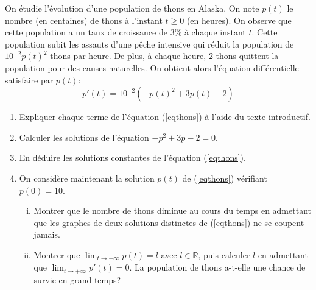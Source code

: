 \begin{exo}
    On étudie l'évolution d'une population de thons en Alaska. On note $p(t)$ le nombre (en centaines) de thons à l'instant $t\ge 0$ (en heures). On observe que cette population a un taux de croissance de 3\% à chaque instant $t$. Cette population subit les assauts d'une pêche intensive qui réduit la population de $10^{-2}p(t)^2$ thons par heure. De plus, à chaque heure, 2 thons quittent la population pour des causes naturelles. On obtient alors l'équation différentielle satisfaire par $p(t)$:
    \begin{equation}\label{eqthons}
        p'(t)=10^{-2}(-p(t)^2+3p(t)-2)
    \end{equation}
    \begin{enumerate}
        \item Expliquer chaque terme de l'équation (\ref{eqthons}) à l'aide du texte introductif.
        \item Calculer les solutions de l'équation $-p^2+3p-2=0$.
        \item En déduire les solutions constantes de l'équation (\ref{eqthons}).
        \item On considère maintenant la solution $p(t)$ de (\ref{eqthons}) vérifiant $p(0)=10$.
        \begin{enumerate}[(i)]
            \item Montrer que  le nombre de thons diminue au cours du temps en admettant que les graphes de
            deux solutions distinctes de (\ref{eqthons}) ne se coupent jamais.
            \item Montrer que $\displaystyle \lim_{t\to +\infty}p(t)=l$ avec $l \in \mathbb{R}$, puis calculer $l$ en admettant que $\displaystyle \lim_{t\to +\infty}p'(t)=0$. La population de thons a-t-elle une chance de survie en grand temps?
        \end{enumerate}
    \end{enumerate}
\end{exo}

